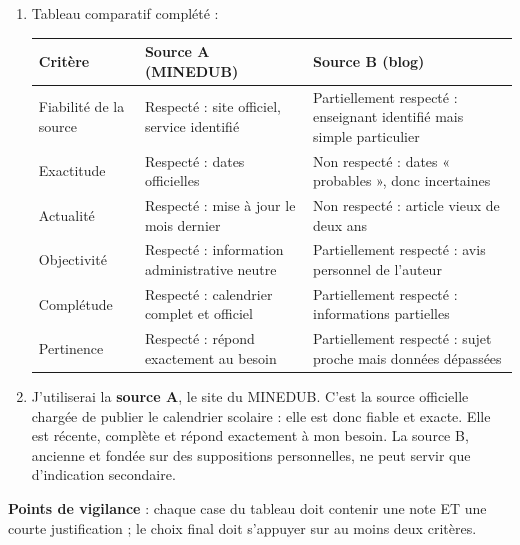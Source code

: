 \documentclass[11pt]{article}
\newcommand{\cle}[1]{{\popxbold\color{popdark}#1}}
\begin{document}
\begin{corrige}
\begin{enumerate}
\item Tableau comparatif complété :
\begin{center}
\begin{tabularx}{\linewidth}{|l|X|X|}
\hline
\rowcolor{popblueL} \textbf{Critère} & \textbf{Source A (MINEDUB)} & \textbf{Source B (blog)} \\
\hline
\cle{Fiabilité} de la source & Respecté : site officiel, service identifié & Partiellement respecté : enseignant identifié mais simple particulier \\
\hline
\cle{Exactitude} & Respecté : dates officielles & Non respecté : dates « probables », donc incertaines \\
\hline
\cle{Actualité} & Respecté : mise à jour le mois dernier & Non respecté : article vieux de deux ans \\
\hline
\cle{Objectivité} & Respecté : information administrative neutre & Partiellement respecté : avis personnel de l'auteur \\
\hline
\cle{Complétude} & Respecté : calendrier complet et officiel & Partiellement respecté : informations partielles \\
\hline
\cle{Pertinence} & Respecté : répond exactement au besoin & Partiellement respecté : sujet proche mais données dépassées \\
\hline
\end{tabularx}
\end{center}
\item J'utiliserai la \textbf{source A}, le site du MINEDUB. C'est la source officielle chargée de publier le calendrier scolaire : elle est donc fiable et exacte. Elle est récente, complète et répond exactement à mon besoin. La source B, ancienne et fondée sur des suppositions personnelles, ne peut servir que d'indication secondaire.
\end{enumerate}
\textbf{Points de vigilance} : chaque case du tableau doit contenir une note ET une courte justification ; le choix final doit s'appuyer sur au moins deux critères.
\end{corrige}
\end{document}
